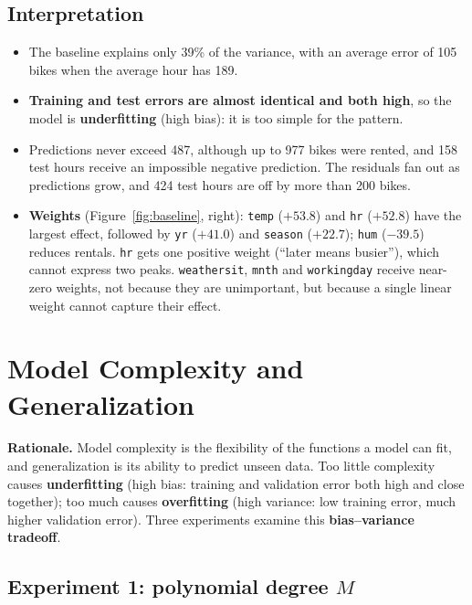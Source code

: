 \documentclass[11pt]{article}
\newcommand{\code}[1]{\texttt{#1}}
\begin{document}
\subsection{Interpretation}

\begin{itemize}
  \item The baseline explains only 39\% of the variance, with an average error of 105 bikes when the average hour has 189.
  \item \textbf{Training and test errors are almost identical and both high}, so the model is
        \textbf{underfitting} (high bias): it is too simple for the pattern.
  \item Predictions never exceed 487, although up to 977 bikes were rented, and 158 test hours receive an
        impossible negative prediction. The residuals fan out as predictions grow, and 424 test hours are off by more than 200 bikes.
  \item \textbf{Weights} (Figure~\ref{fig:baseline}, right): \code{temp} ($+53.8$) and \code{hr} ($+52.8$) have the largest
        effect, followed by \code{yr} ($+41.0$) and \code{season} ($+22.7$); \code{hum} ($-39.5$) reduces rentals.
        \code{hr} gets one positive weight (``later means busier''), which cannot express two peaks.
        \code{weathersit}, \code{mnth} and \code{workingday} receive near-zero weights, not because they are unimportant,
        but because a single linear weight cannot capture their effect.
\end{itemize}

\section{Model Complexity and Generalization}

\textbf{Rationale.} Model complexity is the flexibility of the functions a model can fit, and
generalization is its ability to predict unseen data. Too little complexity causes
\textbf{underfitting} (high bias: training and validation error both high and close together);
too much causes \textbf{overfitting} (high variance: low training error, much higher validation error).
Three experiments examine this \textbf{bias--variance tradeoff}.

\subsection{Experiment 1: polynomial degree $M$}
\end{document}
